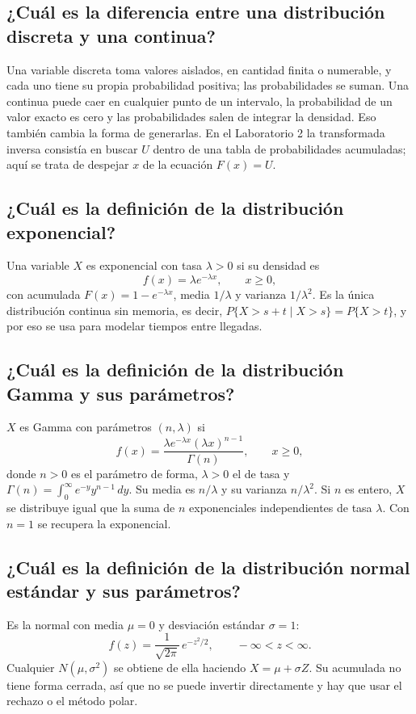 \documentclass[11pt,letterpaper]{article}
\begin{document}
\subsection{¿Cuál es la diferencia entre una distribución discreta y una continua?}

Una variable discreta toma valores aislados, en cantidad finita o numerable, y cada uno tiene su propia
probabilidad positiva; las probabilidades se suman. Una continua puede caer en cualquier punto de un
intervalo, la probabilidad de un valor exacto es cero y las probabilidades salen de integrar la
densidad. Eso también cambia la forma de generarlas. En el Laboratorio 2 la transformada inversa
consistía en buscar $U$ dentro de una tabla de probabilidades acumuladas; aquí se trata de despejar
$x$ de la ecuación $F(x) = U$.

\subsection{¿Cuál es la definición de la distribución exponencial?}

Una variable $X$ es exponencial con tasa $\lambda > 0$ si su densidad es
\[
f(x) = \lambda e^{-\lambda x}, \qquad x \ge 0,
\]
con acumulada $F(x) = 1 - e^{-\lambda x}$, media $1/\lambda$ y varianza $1/\lambda^2$. Es la única
distribución continua sin memoria, es decir, $P\{X > s + t \mid X > s\} = P\{X > t\}$, y por eso se
usa para modelar tiempos entre llegadas.

\subsection{¿Cuál es la definición de la distribución Gamma y sus parámetros?}

$X$ es Gamma con parámetros $(n, \lambda)$ si
\[
f(x) = \frac{\lambda e^{-\lambda x}(\lambda x)^{n-1}}{\Gamma(n)}, \qquad x \ge 0,
\]
donde $n > 0$ es el parámetro de forma, $\lambda > 0$ el de tasa y
$\Gamma(n) = \int_0^\infty e^{-y}y^{n-1}\,dy$. Su media es $n/\lambda$ y su varianza $n/\lambda^2$.
Si $n$ es entero, $X$ se distribuye igual que la suma de $n$ exponenciales independientes de tasa
$\lambda$. Con $n = 1$ se recupera la exponencial.

\subsection{¿Cuál es la definición de la distribución normal estándar y sus parámetros?}

Es la normal con media $\mu = 0$ y desviación estándar $\sigma = 1$:
\[
f(z) = \frac{1}{\sqrt{2\pi}}\,e^{-z^2/2}, \qquad -\infty < z < \infty.
\]
Cualquier $N(\mu, \sigma^2)$ se obtiene de ella haciendo $X = \mu + \sigma Z$. Su acumulada no tiene
forma cerrada, así que no se puede invertir directamente y hay que usar el rechazo o el método polar.
\end{document}
